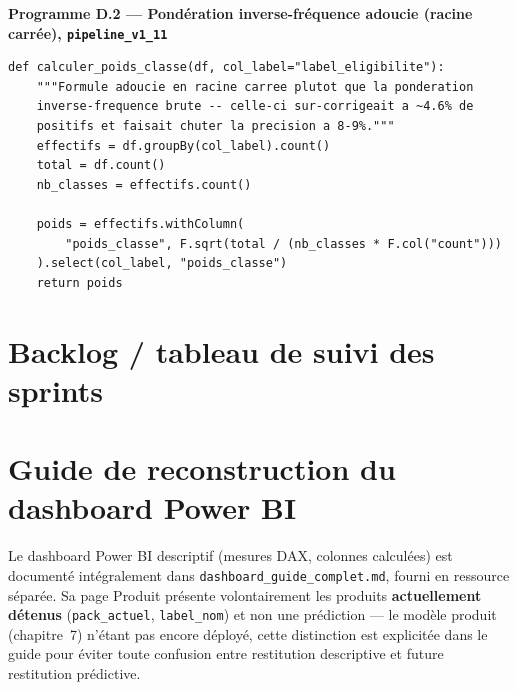 \documentclass[11pt,a4paper]{report}
\begin{document}
{\sffamily\bfseries\small\color{corpslate} Programme D.2 --- Pondération inverse-fréquence adoucie (racine carrée), \texttt{pipeline\_v1\_11}}
\begin{Verbatim}[fontsize=\scriptsize, formatcom=\color{corpslate}, frame=single, rulecolor=\color{lightgrayline}, framesep=3mm, breaklines=true, breaksymbolleft={}, tabsize=2]
def calculer_poids_classe(df, col_label="label_eligibilite"):
    """Formule adoucie en racine carree plutot que la ponderation
    inverse-frequence brute -- celle-ci sur-corrigeait a ~4.6% de
    positifs et faisait chuter la precision a 8-9%."""
    effectifs = df.groupBy(col_label).count()
    total = df.count()
    nb_classes = effectifs.count()

    poids = effectifs.withColumn(
        "poids_classe", F.sqrt(total / (nb_classes * F.col("count")))
    ).select(col_label, "poids_classe")
    return poids
\end{Verbatim}

\chapter{Backlog / tableau de suivi des sprints}

\chapter{Guide de reconstruction du dashboard Power BI}
\statutFait
Le dashboard Power BI descriptif (mesures DAX, colonnes calculées) est
documenté intégralement dans \texttt{dashboard\_guide\_complet.md},
fourni en ressource séparée. Sa page \og Produit \fg{} présente
volontairement les produits \textbf{actuellement détenus}
(\texttt{pack\_actuel}, \texttt{label\_nom}) et non une prédiction — le
modèle produit (chapitre~7) n'étant pas encore déployé, cette distinction
est explicitée dans le guide pour éviter toute confusion entre
restitution descriptive et future restitution prédictive.
\end{document}
